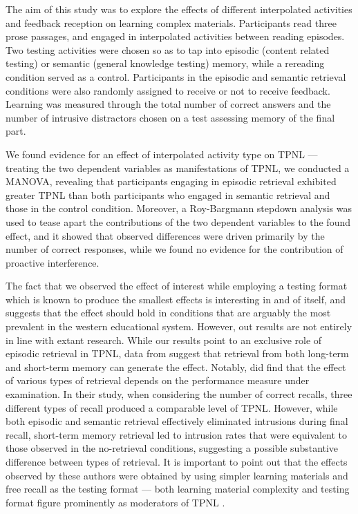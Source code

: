 \documentclass[../main.tex]{subfiles}
\begin{document}
The aim of this study was to explore the effects of different interpolated 
activities and feedback reception on learning complex materials. Participants 
read three prose passages, and engaged in interpolated activities between 
reading episodes. Two testing activities were chosen so as to tap into episodic 
(content related testing) or semantic (general knowledge testing) memory, while 
a rereading condition served as a control. Participants in the episodic and 
semantic retrieval conditions were also randomly assigned to receive or not to 
receive feedback. Learning was measured through the total number of correct 
answers and the number of intrusive distractors chosen on a test assessing 
memory of the final part.

We found evidence for an effect of interpolated activity type on TPNL --- 
treating the two dependent variables as manifestations of TPNL, we conducted a 
MANOVA, revealing that participants engaging in episodic retrieval exhibited 
greater TPNL than both participants who engaged in semantic retrieval and those 
in the control condition. Moreover, a Roy-Bargmann stepdown analysis was used 
to tease apart the contributions of the two dependent variables to the found 
effect, and it showed that observed differences were driven primarily by the 
number of correct responses, while we found no evidence for the contribution of 
proactive interference. 

The fact that we observed the effect of interest while 
employing a testing format which is known to produce the smallest effects is 
interesting in and of itself, and suggests that the effect should hold in 
conditions that are arguably the most prevalent in the western educational 
system. However, out results are not entirely in line with extant 
research. While our results point to an exclusive role of episodic retrieval
in TPNL, data from \cite{pastotterRetrievalLearningFacilitates2011} 
suggest that retrieval from both long-term and short-term memory
can generate the effect. Notably, 
\cite{pastotterRetrievalLearningFacilitates2011} did find that the effect of 
various types of retrieval depends on the performance measure under 
examination. In their study, when considering the number of correct recalls, 
three different types of recall produced a comparable level of TPNL. However, 
while both episodic and semantic retrieval effectively eliminated intrusions 
during final recall, short-term memory retrieval led to intrusion rates that 
were equivalent to those observed in the no-retrieval conditions, suggesting a 
possible substantive difference between types of retrieval. It is important to 
point out that the effects observed by these authors were obtained by using 
simpler learning materials and free recall as the testing format --- both 
learning material complexity and testing format figure prominently as 
moderators of TPNL \citep{chanRetrievalPotentiatesNew2018}.
\end{document}
